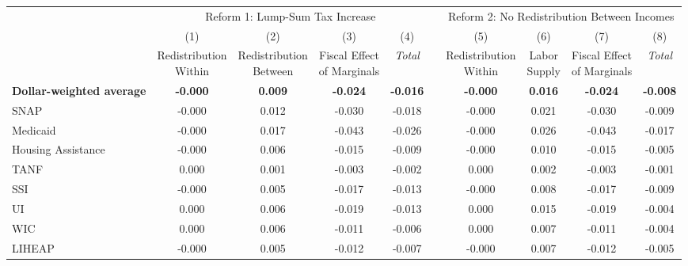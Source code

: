 \begin{tabular*}{1.38\textwidth}{@{\extracolsep{\fill}}lccccccccc}
  \toprule
  \addlinespace
                     & \multicolumn{4}{c}{Reform 1: Lump-Sum Tax Increase}                                  & \multicolumn{1}{l}{} & \multicolumn{4}{c}{Reform 2: No  Redistribution Between Incomes}        \\
\multicolumn{1}{c}{} & (1)                   & (2)                    & (3)                      & (4)            &                      & (5)                   & (6)          & (7)                      & (8)            \\
                     & \shortstack{Redistribution \\ Within} &
\shortstack{Redistribution \\ Between} & \shortstack{Fiscal Effect \\ of
  Marginals} & \textit{Total} &                      &
\shortstack{Redistribution \\ Within} & \shortstack{Labor \\ Supply} &
\shortstack{Fiscal Effect \\ of Marginals} & \textit{Total} \\
\cline{2-5} \cline{7-10}
\textbf{Dollar-weighted average} & \textbf{-0.000}        & \textbf{0.009}         & \textbf{-0.024}             & \textbf{-0.016}  &                      & \textbf{-0.000}        & \textbf{0.016} & \textbf{-0.024}             & \textbf{-0.008}  \\

\addlinespace

SNAP                 & -0.000        & 0.012         & -0.030             & -0.018  &                      & -0.000        & 0.021 & -0.030             & -0.009  \\
Medicaid             & -0.000        & 0.017         & -0.043             & -0.026  &                      & -0.000        & 0.026 & -0.043             & -0.017  \\
Housing Assistance   & -0.000        & 0.006         & -0.015             & -0.009  &                      & -0.000        & 0.010 & -0.015             & -0.005  \\
TANF                 & 0.000        & 0.001         & -0.003             & -0.002  &                      & 0.000        & 0.002 & -0.003             & -0.001  \\
SSI                  & -0.000        & 0.005         & -0.017             & -0.013  &                      & -0.000        & 0.008 & -0.017             & -0.009  \\
UI                   & 0.000        & 0.006         & -0.019             & -0.013  &                      & 0.000        & 0.015 & -0.019             & -0.004  \\
WIC                  & 0.000        & 0.006         & -0.011             & -0.006  &                      & 0.000        & 0.007 & -0.011             & -0.004  \\
LIHEAP               & -0.000
& 0.005         & -0.012
& -0.007  &                      & -0.000
& 0.007 & -0.012             & -0.005
\\

\bottomrule 
\end{tabular*}
